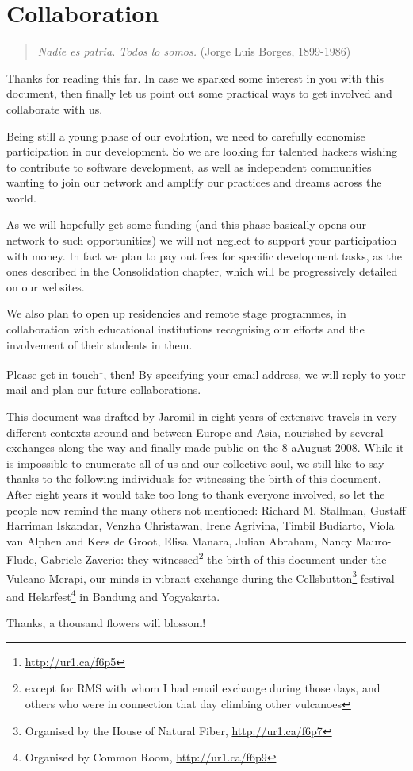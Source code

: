 \section{Collaboration}
\label{s:weaver_birds:collaboration}

\begin{quote}
\textit{Nadie es patria. Todos lo somos.} (Jorge Luis Borges, 1899-1986)
\end{quote}

Thanks for reading this far. In case we sparked some interest in you with this
document, then f\hbox{}inally let us point out some practical ways to get
involved and collaborate with us.

Being still a young phase of our evolution, we need to carefully economise
participation in our development. So we are looking for talented hackers wishing
to contribute to software development, as well as independent communities
wanting to join our network and amplify our practices and dreams across the
world.

As we will hopefully get some funding (and this phase basically opens our
network to such opportunities) we will not neglect to support your participation
with money. In fact we plan to pay out fees for specif\hbox{}ic development
tasks, as the ones described in the Consolidation chapter, which will be
progressively detailed on our websites.

We also plan to open up residencies and remote stage programmes, in
collaboration with educational institutions recognising our ef\hbox{}forts and
the involvement of their students in them.

Please get in touch\footnote{\url{http://ur1.ca/f6p5}}, then! By specifying your
email address, we will reply to your mail and plan our future collaborations.

This document was drafted by Jaromil in eight years of extensive travels in very
dif\hbox{}ferent contexts around and between Europe and Asia, nourished by
several exchanges along the way and f\hbox{}inally made public on the 8 aAugust
2008. While it is impossible to enumerate all of us and our collective soul, we
still like to say thanks to the following individuals for witnessing the birth
of this document. After eight years it would take too long to thank everyone
involved, so let the people now remind the many others not mentioned: Richard M.
Stallman, Gustaf\hbox{}f Harriman Iskandar, Venzha Christawan, Irene Agrivina,
Timbil Budiarto, Viola van Alphen and Kees de Groot, Elisa Manara, Julian
Abraham, Nancy Mauro-F\hbox{}lude, Gabriele Zaverio: they
witnessed\footnote{except for RMS with whom I had email exchange during those
days, and others who were in connection that day climbing other vulcanoes} the
birth of this document under the Vulcano Merapi, our minds in vibrant exchange
during the Cellsbutton\footnote{Organised by the House of Natural F\hbox{}iber,
\url{http://ur1.ca/f6p7}} festival and Helarfest\footnote{Organised by Common
Room, \url{http://ur1.ca/f6p9}} in Bandung and Yogyakarta.

Thanks, a thousand f\hbox{}lowers will blossom!

